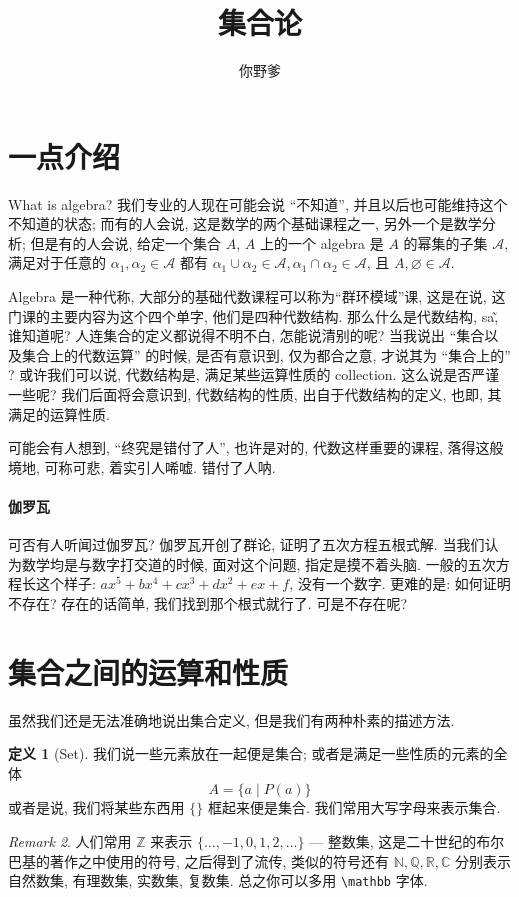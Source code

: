 \documentclass[10pt]{ctexart}
\theoremstyle{definition}
\theoremstyle{definition}
\newtheorem{definition}{定义}[section]
\theoremstyle{plain}
\theoremstyle{remark}
\newtheorem{remark}[definition]{Remark}
\begin{document}
\title{集合论}
\author{你野爹}
\maketitle
\tableofcontents
\newpage

\section{一点介绍}\label{sec:intro}
What is algebra? 我们专业的人现在可能会说 ``不知道'', 并且以后也可能维持这个不知道的状态; 而有的人会说, 这是数学的两个基础课程之一, 另外一个是数学分析; 但是有的人会说, 给定一个集合 \(A\), \(A\) 上的一个 algebra 是 \(A\) 的幂集的子集 \(\mathcal A\), 满足对于任意的 \(\alpha_{1}, \alpha_{2} \in \mathcal A\) 都有 \(\alpha_{1} \cup \alpha_{2} \in \mathcal A, \alpha_{1} \cap \alpha_{2} \in \mathcal A\), 且 \(A , \varnothing \in \mathcal A\). 

Algebra 是一种代称, 大部分的基础代数课程可以称为``群环模域''课, 这是在说, 这门课的主要内容为这个四个单字, 他们是四种代数结构. 那么什么是代数结构, sa\~ , 谁知道呢? 人连集合的定义都说得不明不白, 怎能说清别的呢? 当我说出 ``集合以及集合上的代数运算'' 的时候, 是否有意识到, 仅为都合之意, 才说其为 ``集合上的'' ? 或许我们可以说, 代数结构是, 满足某些运算性质的 collection. 这么说是否严谨一些呢? 我们后面将会意识到, 代数结构的性质, 出自于代数结构的定义, 也即, 其满足的运算性质. 

可能会有人想到, ``终究是错付了人'', 也许是对的, 代数这样重要的课程, 落得这般境地, 可称可悲, 着实引人唏嘘. 错付了人呐. 

\paragraph{伽罗瓦} 可否有人听闻过伽罗瓦? 伽罗瓦开创了群论, 证明了五次方程五根式解. 当我们认为数学均是与数字打交道的时候, 面对这个问题, 指定是摸不着头脑. 一般的五次方程长这个样子: \(a x^{5} + b x ^{4} + c x ^{3} + d x ^{2} + e x + f\), 没有一个数字. 更难的是: 如何证明不存在? 存在的话简单, 我们找到那个根式就行了. 可是不存在呢? 

\section{集合之间的运算和性质}\label{sec:set}
虽然我们还是无法准确地说出集合定义, 但是我们有两种朴素的描述方法. 
\begin{definition}[Set]
我们说一些元素放在一起便是集合; 或者是满足一些性质的元素的全体
\begin{equation}
A = \{ a \mid P (a) \} 
\end{equation}
或者是说, 我们将某些东西用 \(\{ \}\) 框起来便是集合.  我们常用大写字母来表示集合. 
\end{definition}
\begin{remark}
人们常用 \(\mathbb Z\) 来表示 \(\{\dots ,  -1 ,0 , 1 , 2 , \dots \} \) --- 整数集, 这是二十世纪的布尔巴基的著作之中使用的符号, 之后得到了流传, 类似的符号还有 \(\mathbb N, \mathbb Q , \mathbb R, \mathbb C\) 分别表示自然数集, 有理数集, 实数集, 复数集. 总之你可以多用 \verb|\mathbb| 字体. 
\end{remark}
\end{document}
